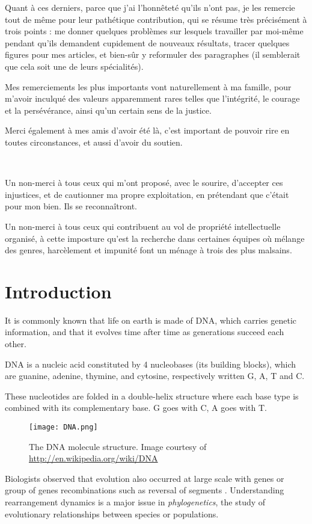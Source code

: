 \documentclass[11pt,final,twoside,nofrench]{thlifl}
\begin{document}
Quant à ces derniers, parce que j'ai l'honnêteté qu'ils n'ont pas, je les remercie tout de même pour leur pathétique contribution, qui se résume très précisément à trois points : me donner quelques problèmes sur lesquels travailler par moi-même pendant qu'ils demandent cupidement de nouveaux résultats, tracer quelques figures pour mes articles, et bien-sûr y reformuler des paragraphes (il semblerait que cela soit une de leurs spécialités).

Mes remerciements les plus importants vont naturellement à ma famille, pour m'avoir inculqué des valeurs apparemment rares telles que l'intégrité, le courage et la persévérance, ainsi qu'un certain sens de la justice.

Merci également à mes amis d'avoir été là, c'est important de pouvoir rire en toutes circonstances, et aussi d'avoir du soutien.

~~

Un non-merci à tous ceux qui m'ont proposé, avec le sourire, d'accepter ces injustices, et de cautionner ma propre exploitation, en prétendant que c'était pour mon bien. Ils se reconnaîtront.

Un non-merci à tous ceux qui contribuent au vol de propriété intellectuelle organisé, à cette imposture qu'est la recherche dans certaines équipes où mélange des genres, harcèlement et impunité font un ménage à trois des plus malsains.

\chapter*{Introduction}

It is commonly known that life on earth is made of DNA, which carries genetic information, and that it evolves time after time as generations succeed each other.

DNA is a nucleic acid constituted by 4 nucleobases (its building blocks), which are guanine, adenine, thymine, and cytosine, respectively written G, A, T and C.

These nucleotides are folded in a double-helix structure where each base type is combined with its complementary base. G goes with C, A goes with T.

\begin{figure}[h!]
\centering
\texttt{[image: DNA.png]}
\caption{The DNA molecule structure. Image courtesy of \url{http://en.wikipedia.org/wiki/DNA}}
\end{figure}

Biologists observed that evolution also occurred at large scale with genes or group of genes recombinations such as reversal of segments \cite{S21} \cite{PH88}. 
 Understanding rearrangement dynamics is a major issue in \emph{phylogenetics}, the study of evolutionary relationships between species or populations.
\end{document}
